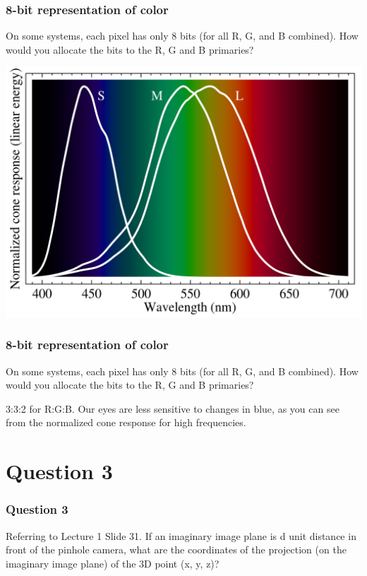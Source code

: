 \documentclass{beamer}
\begin{document}
\begin{frame}
    \frametitle{8-bit representation of color}
    On some systems, each pixel has only 8 bits (for all R, G, and B combined). 
    How would you allocate the bits to the R, G and B primaries?

    \begin{center}
        \includegraphics[scale=0.2]{cone-vision.png}
    \end{center}

\end{frame}

\begin{frame}
    \frametitle{8-bit representation of color}
    On some systems, each pixel has only 8 bits (for all R, G, and B combined). 
    How would you allocate the bits to the R, G and B primaries?

    \begin{tcolorbox}
        3:3:2 for R:G:B. Our eyes are less sensitive to changes in blue, 
        as you can see from the normalized cone response for high frequencies.
    \end{tcolorbox}

\end{frame}

\section{Question 3}

\begin{frame}
    \frametitle{Question 3}
    Referring to Lecture 1 Slide 31. If an imaginary image plane is d unit distance in front of the
    pinhole camera, what are the coordinates of the projection (on the imaginary image plane) of
    the 3D point (x, y, z)?
\end{frame}
\end{document}
